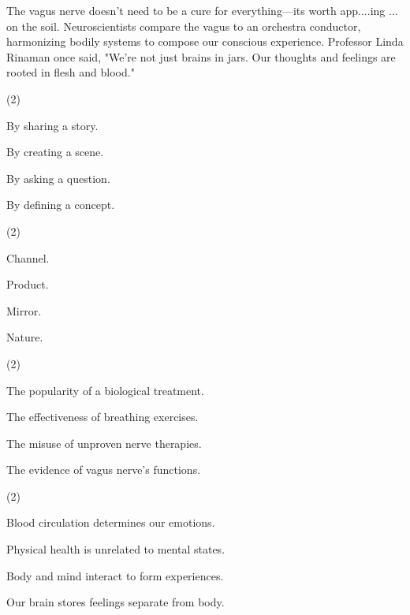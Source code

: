 \documentclass{英语试卷}
\begin{document}
\par The vagus nerve doesn't need to be a cure for everything—its worth app....ing ... on the soil. Neuroscientists compare the vagus to an orchestra conductor, harmonizing bodily systems to compose our conscious experience. Professor Linda Rinaman once said, "We're not just brains in jars. Our thoughts and feelings are rooted in flesh and blood."\par
{}
\begin{choices}(2)
  \item By sharing a story.
  \item By creating a scene.
  \item By asking a question.
  \item By defining a concept.
\end{choices}
\begin{choices}(2)
  \item Channel.
  \item Product.
  \item Mirror.
  \item Nature.
\end{choices}
\begin{choices}(2)
  \item The popularity of a biological treatment.
  \item The effectiveness of breathing exercises.
  \item The misuse of unproven nerve therapies.
  \item The evidence of vagus nerve's functions.
\end{choices}
\begin{choices}(2)
  \item Blood circulation determines our emotions.
  \item Physical health is unrelated to mental states.
  \item Body and mind interact to form experiences.
  \item Our brain stores feelings separate from body.
\end{choices}
\end{document}
